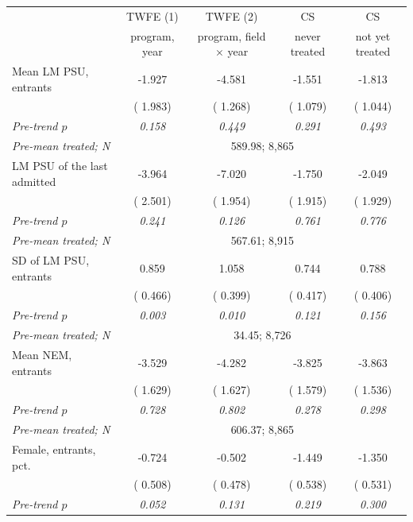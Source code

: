 \begin{tabular}{lcccc}
\toprule
 & TWFE (1) & TWFE (2) & CS & CS \\
 & program, year & program, field \(\times\) year & never treated & not yet treated \\
\midrule
Mean LM PSU, entrants &  -1.927 &  -4.581\sym{***} &  -1.551 &  -1.813\sym{*} \\
 & ( 1.983) & ( 1.268) & ( 1.079) & ( 1.044) \\
\quad \textit{Pre-trend \(p\)} & \textit{0.158} & \textit{0.449} & \textit{0.291} & \textit{0.493} \\
\quad \textit{Pre-mean treated; N} & \multicolumn{4}{c}{\scriptsize  589.98;  8,865} \\
\addlinespace
LM PSU of the last admitted &  -3.964 &  -7.020\sym{***} &  -1.750 &  -2.049 \\
 & ( 2.501) & ( 1.954) & ( 1.915) & ( 1.929) \\
\quad \textit{Pre-trend \(p\)} & \textit{0.241} & \textit{0.126} & \textit{0.761} & \textit{0.776} \\
\quad \textit{Pre-mean treated; N} & \multicolumn{4}{c}{\scriptsize  567.61;  8,915} \\
\addlinespace
SD of LM PSU, entrants &   0.859\sym{*} &   1.058\sym{***} &   0.744\sym{*} &   0.788\sym{*} \\
 & ( 0.466) & ( 0.399) & ( 0.417) & ( 0.406) \\
\quad \textit{Pre-trend \(p\)} & \textit{0.003} & \textit{0.010} & \textit{0.121} & \textit{0.156} \\
\quad \textit{Pre-mean treated; N} & \multicolumn{4}{c}{\scriptsize   34.45;  8,726} \\
\addlinespace
Mean NEM, entrants &  -3.529\sym{**} &  -4.282\sym{***} &  -3.825\sym{**} &  -3.863\sym{**} \\
 & ( 1.629) & ( 1.627) & ( 1.579) & ( 1.536) \\
\quad \textit{Pre-trend \(p\)} & \textit{0.728} & \textit{0.802} & \textit{0.278} & \textit{0.298} \\
\quad \textit{Pre-mean treated; N} & \multicolumn{4}{c}{\scriptsize  606.37;  8,865} \\
\addlinespace
Female, entrants, pct. &  -0.724 &  -0.502 &  -1.449\sym{***} &  -1.350\sym{**} \\
 & ( 0.508) & ( 0.478) & ( 0.538) & ( 0.531) \\
\quad \textit{Pre-trend \(p\)} & \textit{0.052} & \textit{0.131} & \textit{0.219} & \textit{0.300} \\

\end{tabular}
